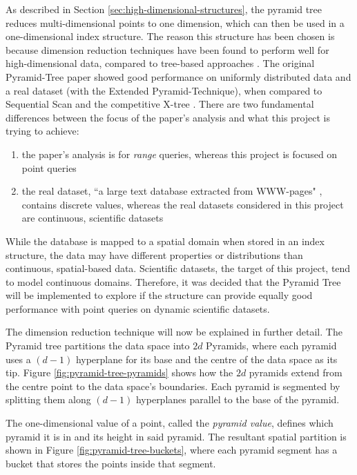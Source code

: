 As described in Section \ref{sec:high-dimensional-structures}, the pyramid tree reduces multi-dimensional points to one dimension, which can then be used in a one-dimensional index structure. The reason this structure has been chosen is because dimension reduction techniques have been found to perform well for high-dimensional data, compared to tree-based approaches \cite{md-structures-samet}. The original Pyramid-Tree paper showed good performance on uniformly distributed data and a real dataset (with the Extended Pyramid-Technique), when compared to Sequential Scan and the competitive X-tree \cite{pyramid-tree}. There are two fundamental differences between the focus of the paper's analysis and what this project is trying to achieve:
\begin{enumerate}
	\item the paper's analysis is for \textit{range} queries, whereas this project is focused on point queries
	\item the real dataset, ``a large text database extracted from WWW-pages" \cite{pyramid-tree}, contains discrete values, whereas the real datasets considered in this project are continuous, scientific datasets
\end{enumerate}
While the database is mapped to a spatial domain when stored in an index structure, the data may have different properties or distributions than continuous, spatial-based data. Scientific datasets, the target of this project, tend to model continuous domains. Therefore, it was decided that the Pyramid Tree will be implemented to explore if the structure can provide equally good performance with point queries on dynamic scientific datasets.

The dimension reduction technique will now be explained in further detail. The Pyramid tree partitions the data space into $2d$ Pyramids, where each pyramid uses a $(d - 1)$ hyperplane for its base and the centre of the data space as its tip. Figure \ref{fig:pyramid-tree-pyramids} shows how the $2d$ pyramids extend from the centre point to the data space's boundaries. Each pyramid is segmented by splitting them along $(d-1)$ hyperplanes parallel to the base of the pyramid.

The one-dimensional value of a point, called the \textit{pyramid value}, defines which pyramid it is in and its height in said pyramid. The resultant spatial partition is shown in Figure \ref{fig:pyramid-tree-buckets}, where each pyramid segment has a bucket that stores the points inside that segment.

